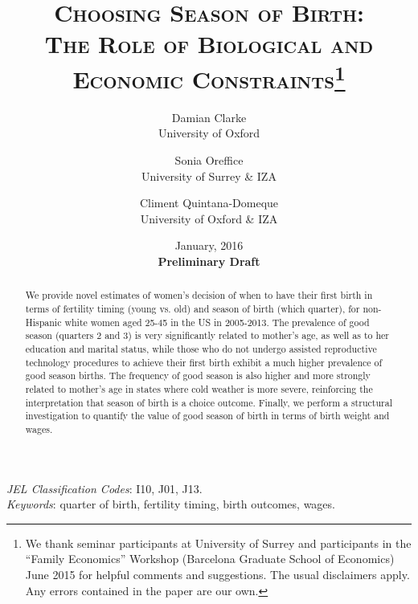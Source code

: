 \documentclass[a4paper, 12 pt]{article}
\theoremstyle{plain}
\begin{document}
\title{\Large{\textsc{Choosing Season of Birth:}}\\ \Large{\textsc{The Role of Biological and Economic Constraints}}\thanks{\scriptsize{We thank seminar participants at University of Surrey and participants in the ``Family Economics'' Workshop (Barcelona Graduate School of Economics) June 2015 for helpful comments and suggestions. The usual disclaimers apply. Any errors contained in the paper are our own.}}}
\author{\small{Damian Clarke} \\ \small{University of Oxford} \and \small{Sonia Oreffice} \\ \small{University of Surrey \& IZA}  \and \small{Climent Quintana-Domeque} \\ \small{University of Oxford \& IZA}}

\date{\small{January, 2016} \\ \vspace{2mm} \small{\textbf{Preliminary Draft}}}



\maketitle
\thispagestyle{empty}

\begin{abstract}
We provide novel estimates of women's decision of when to have their first birth in terms of fertility timing (young vs. old) and season of birth (which quarter), for non-Hispanic white women aged 25-45 in the US in 2005-2013. The prevalence of good season (quarters 2 and 3) is very significantly related to mother's age, as well as to her education and marital status, while those who do not undergo assisted reproductive technology procedures to achieve their first birth exhibit a much higher prevalence of good season births. The frequency of good season is also higher and more strongly related to mother's age in states where cold weather is more severe, reinforcing the interpretation that season of birth is a choice outcome. Finally, we perform a structural investigation to quantify the value of good season of birth in terms of birth weight and wages.
\end{abstract}
\emph{JEL Classification Codes}: I10, J01, J13.\\
\emph{Keywords}: quarter of birth, fertility timing, birth outcomes, wages.
\end{document}
